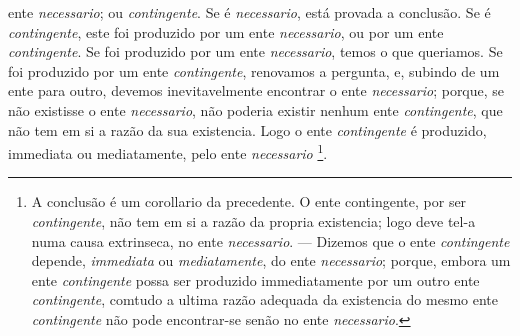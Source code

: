 ente \emph{necessario}; ou \emph{contingente}. Se é \emph{necessario}, está provada a conclusão. Se é \emph{contingente}, este foi produzido por um ente \emph{necessario}, ou por um ente \emph{contingente}. Se foi produzido por um ente \emph{necessario}, temos o que queriamos. Se foi produzido por um ente \emph{contingente}, renovamos a pergunta, e, subindo de um ente para outro, devemos inevitavelmente encontrar o ente \emph{necessario}; porque, se não existisse o ente \emph{necessario}, não poderia existir nenhum ente \emph{contingente}, que não tem em si a razão da sua existencia. Logo o ente \emph{contingente} é produzido, immediata ou mediatamente, pelo ente \emph{necessario} \footnote{A conclusão é um corollario da precedente. O ente contingente, por ser \emph{contingente}, não tem em si a razão da propria existencia; logo deve tel-a numa causa extrinseca, no ente \emph{necessario}. --- Dizemos que o ente \emph{contingente} depende, \emph{immediata} ou \emph{mediatamente}, do ente \emph{necessario}; porque, embora um ente \emph{contingente} possa ser produzido immediatamente por um outro ente \emph{contingente}, comtudo a ultima razão adequada da existencia do mesmo ente \emph{contingente} não pode encontrar-se senão no ente \emph{necessario}.}.

